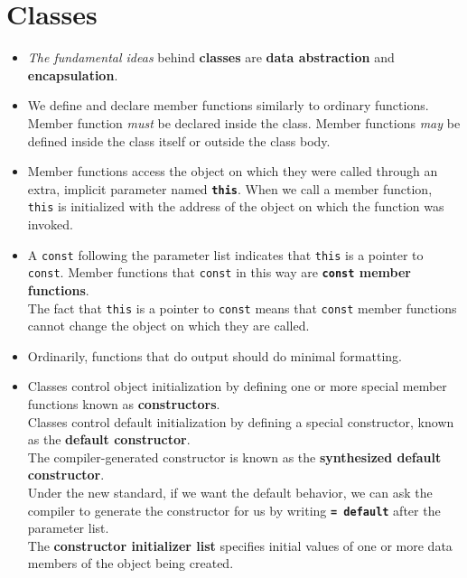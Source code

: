\section{Classes}
\begin{itemize}

\item
\textit{The fundamental ideas} behind \textbf{classes} are \textbf{data abstraction} and \textbf{encapsulation}.

\item
We define and declare member functions similarly to ordinary functions. Member function \textit{must} be declared inside the class. Member functions \textit{may} be defined inside the class itself or outside the class body.

\item
Member functions access the object on which they were called through an extra, implicit parameter named \textbf{\texttt{this}}. When we call a member function, \texttt{this} is initialized with the address of the object on which the function was invoked.

\item
A \texttt{const} following the parameter list indicates that \texttt{this} is a pointer to \texttt{const}. Member functions that \texttt{const} in this way are \textbf{\texttt{const} member functions}.\\
The fact that \texttt{this} is a pointer to \texttt{const} means that \texttt{const} member functions cannot change the object on which they are called.

\item
Ordinarily, functions that do output should do minimal formatting.

\item
Classes control object initialization by defining one or more special member functions known as \textbf{constructors}.\\
Classes control default initialization by defining a special constructor, known as the \textbf{default constructor}.\\
The compiler-generated constructor is known as the \textbf{synthesized default constructor}.\\
Under the new standard, if we want the default behavior, we can ask the compiler to generate the constructor for us by writing \textbf{\texttt{= default}} after the parameter list.\\
The \textbf{constructor initializer list} specifies initial values of one or more data members of the object being created.


\end{itemize}
